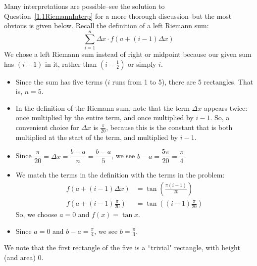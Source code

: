 \begin{solution}
Many interpretations are possible--see the solution to Question~\ref{1.1RiemannInterp} for a more thorough discussion--but the most obvious is given below. Recall the definition of a left Riemann sum:
\[\sum_{i=1}^n \Delta x \cdot f\left(a+(i-1)\Delta x\right)\]
We chose a left Riemann sum instead of right or midpoint because our given sum has $(i-1)$ in it, rather than $(i-\frac{1}{2})$ or simply $i$.
\begin{itemize}
\item Since the sum has five terms ($i$ runs from 1 to 5), there are 5 rectangles. That is, $n=5$.
\item In the definition of the Riemann sum, note that the term $\Delta x$ appears twice: once multiplied by the entire term, and once multiplied by $i-1$. So, a convenient choice for $\Delta x$ is $\frac{\pi}{20}$, because this is the constant that is both multiplied at the start of the term, and multiplied by $i-1$.
\item Since $\dfrac{\pi}{20}=\Delta x = \dfrac{b-a}{n} = \dfrac{b-a}{5}$, we see $b-a=\dfrac{5\pi}{20}=\dfrac{\pi}{4}$.
\item We match the terms in the definition with the terms in the problem:
\begin{align*}
f(a+(i-1)\Delta x) & = \tan\left(\frac{\pi (i-1)}{20}\right)\\
f\left(a+(i-1)\frac{\pi}{20}\right) & = \tan\left((i-1)\frac{\pi }{20}\right)
\end{align*}
So, we choose $a=0$ and $f(x) = \tan x$.
\item Since $a=0$ and $b-a=\frac{\pi}{4}$, we see $b=\frac{\pi}{4}$.
\end{itemize}


\begin{center}
\end{center}
We note that the first rectangle of the five is a ``trivial" rectangle, with height (and area) 0.
\end{solution}



